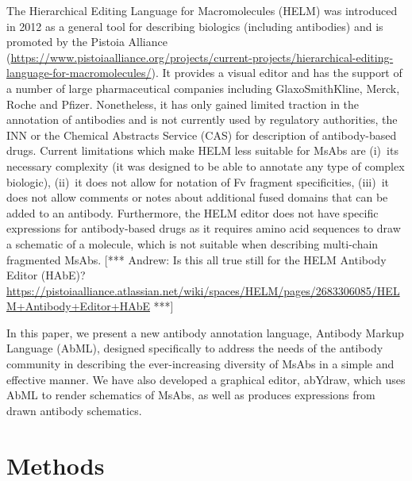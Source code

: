 \documentclass[a4]{article}
\newcommand{\andrew}[1]{{\color{red} [*** Andrew: #1 ***]}}
\begin{document}
The Hierarchical Editing Language for Macromolecules (HELM) \cite{zhang:2012} was
introduced in 2012 as a general tool for describing biologics (including antibodies) and is promoted by
the Pistoia Alliance
(\url{https://www.pistoiaalliance.org/projects/current-projects/hierarchical-editing-language-for-macromolecules/}).
It provides a visual editor and has the support of a number of large pharmaceutical companies
including GlaxoSmithKline, Merck, Roche and Pfizer. 
Nonetheless, it has only gained limited traction in the annotation of antibodies
and is not currently used by regulatory authorities, the INN or the
Chemical Abstracts Service (CAS) for description of antibody-based drugs.
Current limitations which make HELM less suitable for MsAbs are (i)~its
necessary complexity (it was designed to be able to annotate any type of
complex biologic), (ii)~it does not allow for
notation of Fv fragment specificities, (iii)~it does not allow comments or notes
about additional fused domains that can be added to an antibody.
Furthermore, the HELM editor does not have specific
expressions for antibody-based drugs as it requires amino acid
sequences to draw a schematic of a molecule, which is not suitable
when describing multi-chain fragmented MsAbs.
\andrew{Is this all true still for the HELM Antibody Editor (HAbE)?
  \url{https://pistoiaalliance.atlassian.net/wiki/spaces/HELM/pages/2683306085/HELM+Antibody+Editor+HAbE}}

In this paper, we present a new antibody annotation language, Antibody
Markup Language (AbML), designed specifically to address the needs of
the antibody community in describing the ever-increasing diversity of
MsAbs in a simple and effective manner. We have also developed a
graphical editor, abYdraw, which uses AbML to render schematics of
MsAbs, as well as produces expressions from drawn antibody schematics.

\section{Methods}
\end{document}
